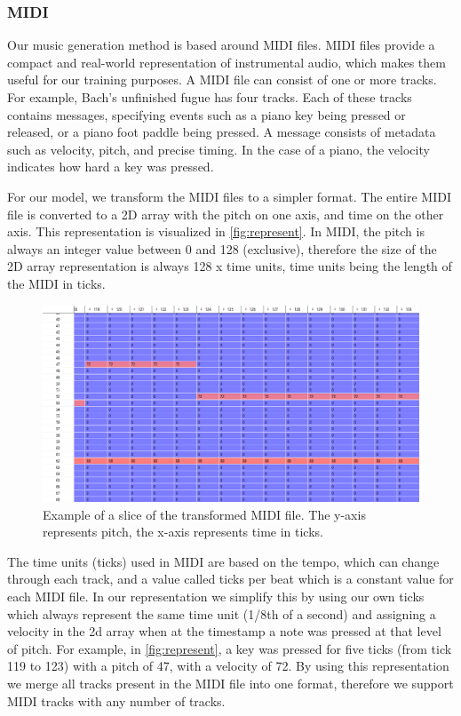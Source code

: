 \documentclass[11pt, twocolumn]{article}
\begin{document}
\subsubsection{MIDI}
Our music generation method is based around MIDI files. MIDI files provide a compact and real-world representation of instrumental audio, which makes them useful for our training purposes. A MIDI file can consist of one or more tracks. For example, Bach's unfinished fugue has four tracks. Each of these tracks contains messages, specifying events such as a piano key being pressed or released, or a piano foot paddle being pressed. A message consists of metadata such as velocity, pitch, and precise timing. In the case of a piano, the velocity indicates how hard a key was pressed. 
\par
For our model, we transform the MIDI files to a simpler format. The entire MIDI file is converted to a 2D array with the pitch on one axis, and time on the other axis. This representation is visualized in \autoref{fig:represent}. In MIDI, the pitch is always an integer value between 0 and 128 (exclusive), therefore the size of the 2D array representation is always 128 x time units, time units being the length of the MIDI in ticks.
\begin{figure}[h]
    \centering
    \includegraphics[width=\textwidth]{images/data.png}
    \caption{Example of a slice of the transformed MIDI file. The y-axis represents pitch, the x-axis represents time in ticks.}
    \label{fig:represent}
\end{figure}
\par
The time units (ticks) used in MIDI are based on the tempo, which can change through each track, and a value called ticks per beat which is a constant value for each MIDI file. In our representation we simplify this by using our own ticks which always represent the same time unit (1/8th of a second) and assigning a velocity in the 2d array when at the timestamp a note was pressed at that level of pitch. For example, in \autoref{fig:represent}, a key was pressed for five ticks (from tick 119 to 123) with a pitch of 47, with a velocity of 72.
By using this representation we merge all tracks present in the MIDI file into one format, therefore we support MIDI tracks with any number of tracks.
\end{document}

